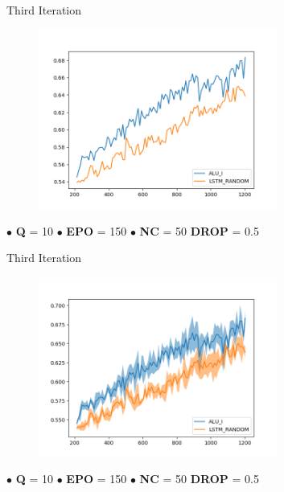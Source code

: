 \documentclass[10pt]{beamer}
\begin{document}
\begin{frame}[fragile]{Third Iteration}
\begin{figure}[H]
    \centering
    \includegraphics[width=0.7\textwidth]{images/acl_n150_q10_comparison}
\end{figure}

\hspace{0.5cm} $\bullet$ \textbf{Q} = 10 \hspace{0.5cm} $\bullet$ \textbf{EPO} = 150 \hspace{0.5cm}
$\bullet$ \textbf{NC} = 50 \hspace{0.5cm} \textbf{DROP} = 0.5
\end{frame}

\begin{frame}[fragile]{Third Iteration}
\begin{figure}[H]
    \centering
    \includegraphics[width=0.7\textwidth]{images/acl_n150_q10_std_comparison}
\end{figure}

\hspace{0.5cm} $\bullet$ \textbf{Q} = 10 \hspace{0.5cm} $\bullet$ \textbf{EPO} = 150 \hspace{0.5cm}
$\bullet$ \textbf{NC} = 50 \hspace{0.5cm} \textbf{DROP} = 0.5
\end{frame}
\end{document}
